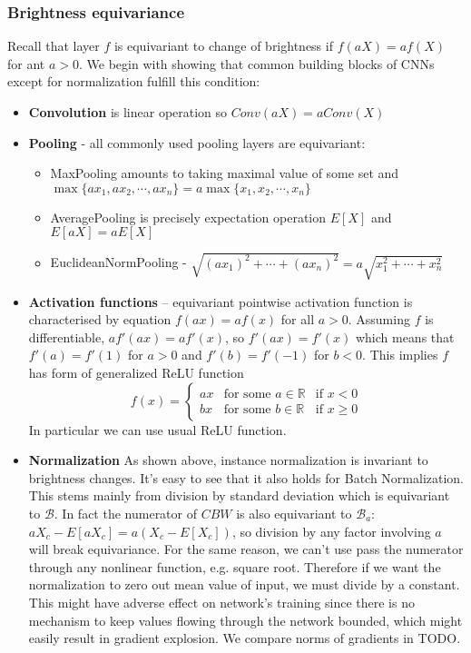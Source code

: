 \subsubsection{Brightness equivariance}
Recall that layer $f$ is equivariant to
change of brightness if $ f(aX) = af(X)$ for ant $a>0$.
We begin with showing that common building blocks of CNNs except for
normalization fulfill this condition:
\begin{itemize}
    \item \textbf{Convolution} is linear operation so $\mathit{Conv}(aX) =
        a\mathit{Conv}(X)$
    \item \textbf{Pooling} - all commonly used pooling layers are equivariant:
        \begin{itemize}
            \item MaxPooling amounts to taking maximal value of some set and\\
                $\max\{ax_1,ax_2,\cdots,ax_n\}=a\max\{x_1,x_2,\cdots,x_n\}$
            \item AveragePooling is precisely expectation operation $E[X]$ and
                    $E[aX] = aE[X]$
            \item EuclideanNormPooling -
                $\sqrt{(ax_1)^2+\cdots+(ax_n)^2} = a\sqrt{x_1^2+\cdots+x_n^2}$
        \end{itemize}
    \item \textbf{Activation functions} -- equivariant pointwise activation
        function is characterised by equation $f(ax) = af(x)$ for all $a>0$.
        Assuming $f$ is differentiable, $af'(ax) = af'(x)$, so $f'(ax)=f'(x)$ which
        means that $f'(a)=f'(1)$ for $a>0$ and $f'(b)=f'(-1)$ for $b<0$.
        This implies $f$ has form of generalized ReLU function
        $$f(x)=\left\{
            \begin{array}{lll}
                ax & \mbox{for some } a \in \mathbb{R} & \mbox{if } x<0 \\
                bx & \mbox{for some } b \in \mathbb{R} & \mbox{if } x \geq 0
            \end{array}\right.$$
        In particular we can use usual ReLU function.
    \item \textbf{Normalization} As shown above, instance normalization is
        invariant to brightness changes. It's easy to see that it also holds
        for Batch Normalization. This stems mainly from division by
        standard deviation which is equivariant to $\mathcal{B}$. In fact
        the numerator of $\mathit{CBW}$ is also equivariant to $\mathcal{B}_a$:
        $aX_c-E[aX_c]=a(X_c-E[X_c])$, so division by any factor involving $a$
        will break equivariance. For the same reason, we can't use pass the
        numerator through any nonlinear function, e.g. square root.
        Therefore if we want the normalization to zero
        out mean value of input, we must divide by a constant. This might have
        adverse effect on network's training since there is no mechanism to keep
        values flowing through the network bounded, which might easily result in
        gradient explosion. We compare norms of gradients in {\color{red}TODO}.
\end{itemize}
